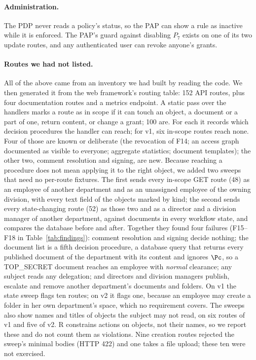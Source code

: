 \paragraph{Administration.} The PDP never reads a policy's status, so the PAP can show a rule as inactive while
it is enforced. The PAP's guard against disabling $P_7$ exists on one of its two update routes, and any
authenticated user can revoke anyone's grants.

\paragraph{Routes we had not listed.} All of the above came from an inventory we had built by reading the code.
We then generated it from the web framework's routing table: 152 API routes, plus four documentation routes and a
metrics endpoint. A static pass over the handlers marks a route as in scope if it can touch an object, a document
or a part of one, return content, or change a grant; 100 are. For each it records which decision procedures the
handler can reach; for v1, six in-scope routes reach none. Four of those are known or deliberate (the revocation
of F14; an access graph documented as visible to everyone; aggregate statistics; document templates); the other
two, comment resolution and signing, are new. Because reaching a procedure does not
mean applying it to the right object, we added two sweeps that need no per-route fixtures. The first sends every
in-scope GET route (48) as an employee of another department and as an unassigned employee of the owning
division, with every text field of the objects marked by kind; the second sends every state-changing route (52)
as those two and as a director and a division manager of another department, against documents in every workflow
state, and compares the database before and after. Together they found four failures (F15--F18 in
Table~\ref{tab:findings}): comment resolution and signing decide nothing; the document list is a fifth decision
procedure, a database query that returns every published document of the department with its content and
ignores $\Pc$, so a TOP\_SECRET document reaches an employee with \emph{normal} clearance; any subject reads any
delegation; and directors and division managers publish, escalate and remove another department's documents and
folders. On v1 the state sweep flags ten routes; on v2 it flags one, because an employee may create a folder in
her own department's space, which no requirement covers. The sweeps also show names and titles of objects the
subject may not read, on six routes of v1 and five of v2. R constrains actions on objects, not their names, so we report these and do not count them as
violations. Nine creation
routes rejected the sweep's minimal bodies (HTTP 422) and one takes a file upload; these ten were not exercised.


